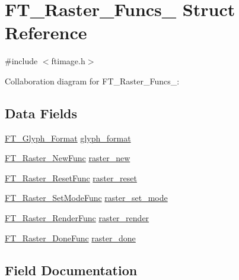 \hypertarget{struct_f_t___raster___funcs__}{}\section{F\+T\+\_\+\+Raster\+\_\+\+Funcs\+\_\+ Struct Reference}
\label{struct_f_t___raster___funcs__}


{\ttfamily \#include $<$ftimage.\+h$>$}



Collaboration diagram for F\+T\+\_\+\+Raster\+\_\+\+Funcs\+\_\+\+:
\subsection*{Data Fields}
\begin{DoxyCompactItemize}
\item 
\hyperlink{ftimage_8h_aeca0d10a27aedecbf96515e0628aff1f}{F\+T\+\_\+\+Glyph\+\_\+\+Format} \hyperlink{struct_f_t___raster___funcs___a741b43afa16f1f1b7f633cebd9f1d6a9}{glyph\+\_\+format}
\item 
\hyperlink{ftimage_8h_acfff989cc4f373de6211b12c97a265e8}{F\+T\+\_\+\+Raster\+\_\+\+New\+Func} \hyperlink{struct_f_t___raster___funcs___a31c9df9af6636df8a17a11bcd921b6a4}{raster\+\_\+new}
\item 
\hyperlink{ftimage_8h_a0ae680a37517fe355321f780123d12f6}{F\+T\+\_\+\+Raster\+\_\+\+Reset\+Func} \hyperlink{struct_f_t___raster___funcs___a91e9decd6066090a5f306f33f9815d39}{raster\+\_\+reset}
\item 
\hyperlink{ftimage_8h_a959011dc7420bae5989460bfd0727bd1}{F\+T\+\_\+\+Raster\+\_\+\+Set\+Mode\+Func} \hyperlink{struct_f_t___raster___funcs___a3b37c781e54cf933cb60f57f2d45b32c}{raster\+\_\+set\+\_\+mode}
\item 
\hyperlink{ftimage_8h_a4da783a601182e9e5b9d75584fd814ec}{F\+T\+\_\+\+Raster\+\_\+\+Render\+Func} \hyperlink{struct_f_t___raster___funcs___a7479a3def4522ce2667d6772e7bb96a5}{raster\+\_\+render}
\item 
\hyperlink{ftimage_8h_a2df7d8d26927263fc038263851b18cf6}{F\+T\+\_\+\+Raster\+\_\+\+Done\+Func} \hyperlink{struct_f_t___raster___funcs___aecfd50bb6567d4442c997467cd68c857}{raster\+\_\+done}
\end{DoxyCompactItemize}


\subsection{Field Documentation}
\mbox{\label{struct_f_t___raster___funcs___a741b43afa16f1f1b7f633cebd9f1d6a9}} 
